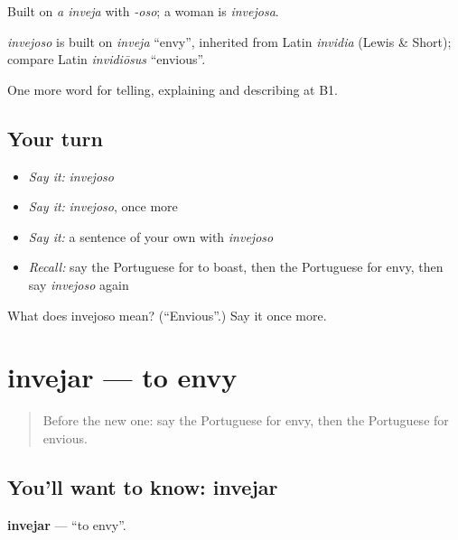 Built on \emph{a inveja} with \emph{-oso}; a woman is \emph{invejosa}.

\begin{cousinweb}
\emph{invejoso} is built on \emph{inveja} \textquotedblleft{}envy\textquotedblright{}, inherited from Latin \emph{invidia} (Lewis \& Short); compare Latin \emph{invidiōsus} \textquotedblleft{}envious\textquotedblright{}.
\end{cousinweb}

\begin{grammarlens}[title={What you've built}]
One more word for telling, explaining and describing at B1.
\end{grammarlens}

\subsection*{Your turn}
\begin{itemize}
\raggedright
  \item \emph{Say it:} \emph{invejoso}
  \item \emph{Say it:} \emph{invejoso}, once more
  \item \emph{Say it:} a sentence of your own with \emph{invejoso}
  \item \emph{Recall:} say the Portuguese for to boast, then the Portuguese for envy, then say \emph{invejoso} again
\end{itemize}

\begin{tcolorbox}[breakable,colback=teal!4,colframe=teal!35!black,title={Before you move on}]
What does invejoso mean? (\textquotedblleft{}Envious\textquotedblright{}.) Say it once more.
\end{tcolorbox}
\section[invejar]{invejar — to envy}

\label{lesson:PT-C468-invejar}



\begin{quote}
Before the new one: say the Portuguese for envy, then the Portuguese for envious.
\end{quote}

\subsection*{You'll want to know: invejar}
\textbf{invejar} — \textquotedblleft{}to envy\textquotedblright{}.

